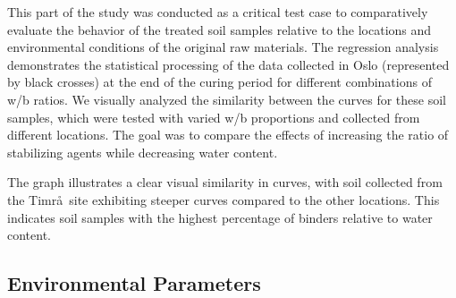 \documentclass[sustainability,article,accept,pdftex,moreauthors]{Definitions/mdpi}
\begin{document}
{{{This part of the study was conducted as a critical test case to comparatively evaluate the behavior of the treated soil samples relative to the locations and environmental conditions of the original raw materials. The regression analysis demonstrates the statistical processing of the data collected in Oslo (represented by black crosses) at the end of the curing period for different combinations of w/b ratios. We visually analyzed the similarity between the curves for these soil samples, which were tested with varied w/b proportions and collected from different locations. The goal was to compare the effects of increasing the ratio of stabilizing agents while decreasing water content.

The graph illustrates a clear visual similarity in curves, with soil collected from the Timr\aa~site exhibiting steeper curves compared to the other locations. This indicates soil samples with the highest percentage of binders relative to water content. } %

\subsection{Environmental Parameters}

}}
\end{document}

